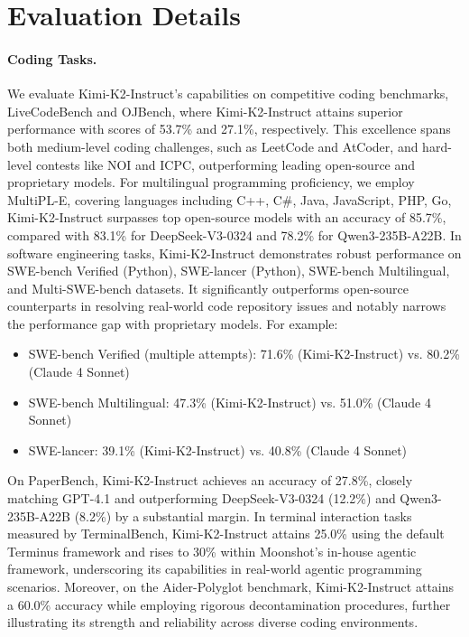 \section{Evaluation Details}
\label{sec:k2-post-train-eval-details}

\paragraph{Coding Tasks.}{
We evaluate Kimi-K2-Instruct's capabilities on competitive coding benchmarks, LiveCodeBench and OJBench, where Kimi-K2-Instruct attains superior performance with scores of 53.7\% and 27.1\%, respectively. This excellence spans both medium-level coding challenges, such as LeetCode and AtCoder, and hard-level contests like NOI and ICPC, outperforming leading open-source and proprietary models.
For multilingual programming proficiency, we employ MultiPL-E, covering languages including C++, C\#, Java, JavaScript, PHP, Go, Kimi-K2-Instruct surpasses top open-source models with an accuracy of 85.7\%, compared with 83.1\% for DeepSeek-V3-0324 and 78.2\% for Qwen3-235B-A22B.
In software engineering tasks, Kimi-K2-Instruct demonstrates robust performance on SWE-bench Verified (Python), SWE-lancer (Python), SWE-bench Multilingual, and Multi-SWE-bench datasets. It significantly outperforms open-source counterparts in resolving real-world code repository issues and notably narrows the performance gap with proprietary models. For example:
\begin{itemize}
    \item SWE-bench Verified (multiple attempts): 71.6\% (Kimi-K2-Instruct) vs. 80.2\% (Claude 4 Sonnet) 
    \item SWE-bench Multilingual: 47.3\% (Kimi-K2-Instruct) vs. 51.0\% (Claude 4 Sonnet)  
    \item SWE-lancer: 39.1\% (Kimi-K2-Instruct) vs. 40.8\% (Claude 4 Sonnet)  
\end{itemize}
On PaperBench, Kimi-K2-Instruct achieves an accuracy of 27.8\%, closely matching GPT-4.1 and outperforming DeepSeek-V3-0324 (12.2\%) and Qwen3-235B-A22B (8.2\%) by a substantial margin.
In terminal interaction tasks measured by TerminalBench, Kimi-K2-Instruct attains 25.0\% using the default Terminus framework and rises to 30\% within Moonshot's in-house agentic framework, underscoring its capabilities in real-world agentic programming scenarios.
Moreover, on the Aider-Polyglot benchmark, Kimi-K2-Instruct attains a 60.0\% accuracy while employing rigorous decontamination procedures, further illustrating its strength and reliability across diverse coding environments.
}

